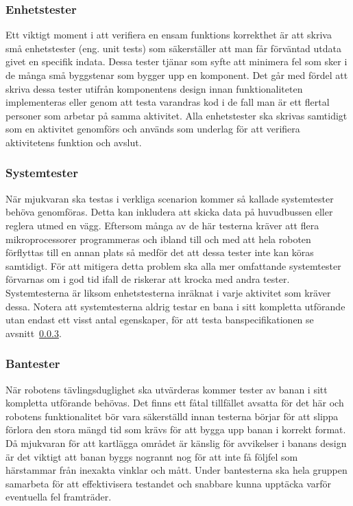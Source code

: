 \documentclass{article}
\begin{document}
\subsubsection{Enhetstester}
Ett viktigt moment i att verifiera en ensam funktions korrekthet är att skriva små enhetstester (eng. unit tests) som säkerställer att man får förväntad utdata givet en specifik indata. Dessa tester tjänar som syfte att minimera fel som sker i de många små byggstenar som bygger upp en komponent. Det går med fördel att skriva dessa tester utifrån komponentens design innan funktionaliteten implementeras eller genom att testa varandras kod i de fall man är ett flertal personer som arbetar på samma aktivitet. Alla enhetstester ska skrivas samtidigt som en aktivitet genomförs och används som underlag för att verifiera aktivitetens funktion och avslut.

\subsubsection{Systemtester}
När mjukvaran ska testas i verkliga scenarion kommer så kallade systemtester behöva genomföras. Detta kan inkludera att skicka data på huvudbussen eller reglera utmed en vägg. Eftersom många av de här testerna kräver att flera mikroprocessorer programmeras och ibland till och med att hela roboten förflyttas till en annan plats så medför det att dessa tester inte kan köras samtidigt. För att mitigera detta problem ska alla mer omfattande systemtester förvarnas om i god tid ifall de riskerar att krocka med andra tester. Systemtesterna är liksom enhetstesterna inräknat i varje aktivitet som kräver dessa. Notera att systemtesterna aldrig testar en bana i sitt kompletta utförande utan endast ett visst antal egenskaper, för att testa banspecifikationen se avsnitt~\ref{sec:bantester}.

\subsubsection{Bantester}
\label{sec:bantester}
När robotens tävlingsduglighet ska utvärderas kommer tester av banan i sitt kompletta utförande behövas. Det finns ett fåtal tillfället avsatta för det här och robotens funktionalitet bör vara säkerställd innan testerna börjar för att slippa förlora den stora mängd tid som krävs för att bygga upp banan i korrekt format. Då mjukvaran för att kartlägga området är känslig för avvikelser i banans design är det viktigt att banan byggs nogrannt nog för att inte få följfel som härstammar från inexakta vinklar och mått. Under bantesterna ska hela gruppen samarbeta för att effektivisera testandet och snabbare kunna upptäcka varför eventuella fel framträder.
\end{document}
